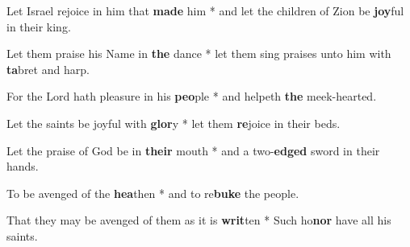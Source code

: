 \begin{multicols}{2}
	Let Israel rejoice in him that \textbf{made} him * and let the children of Zion be \textbf{joy}ful in their king.
	
	Let them praise his Name in \textbf{the} dance * let them sing praises unto him with \textbf{ta}bret and harp.
	
	For the Lord hath pleasure in his \textbf{peo}ple * and helpeth \textbf{the} meek-hearted.
	
	Let the saints be joyful with \textbf{glor}y * let them \textbf{re}joice in their beds.
	
	Let the praise of God be in \textbf{their} mouth * and a two-\textbf{edged} sword in their hands.
	
	To be avenged of the \textbf{hea}then * and to re\textbf{buke} the people.
	
	That they may be avenged of them as it is \textbf{writ}ten * Such ho\textbf{nor} have all his saints.
\end{multicols}